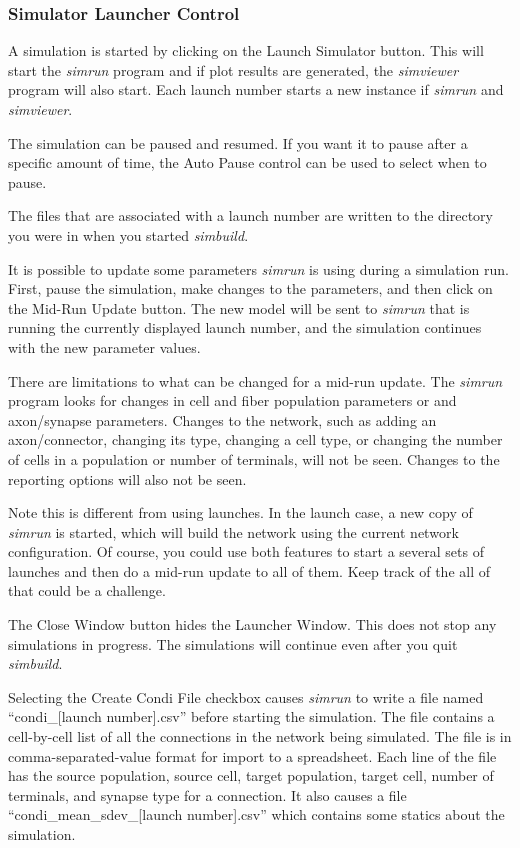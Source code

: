 \documentclass[12pt,openany,oneside]{book}
\newcommand{\prog}[1]{\textit{{#1}}}
\newcommand{\inquotes}[1]{{{``#1''}}}
\begin{document}
\subsubsection{Simulator Launcher Control}

A simulation is started by clicking on the Launch Simulator button.
This will start the \prog{simrun} program and if plot results are
generated, the \prog{simviewer} program will also start.
Each launch number starts a new instance if \prog{simrun} and 
\prog{simviewer}.

The simulation can be paused and resumed. If you want it to pause after
a specific amount of time, the Auto Pause control can be used to select
when to pause.

The files that are associated with a launch number are written to the
directory you were in when you started \prog{simbuild}.

It is possible to update some parameters \prog{simrun} is using during a
simulation run. First, pause the simulation, make changes to the
parameters, and then click on the Mid-Run Update button. The new model
will be sent to \prog{simrun} that is running the currently displayed
launch number, and the simulation continues with the new parameter values.

There are limitations to what can be
changed for a mid-run update. The \prog{simrun} program looks for changes
in cell and fiber population parameters or and axon/synapse parameters.
Changes to the network, such as adding an axon/connector, changing its
type, changing a cell type, or changing the number of cells in a
population or number of terminals, will not be seen. Changes to the
reporting options will also not be seen.

Note this is different from using launches. In the launch case, a new copy
of \prog{simrun} is started, which will build the network using the
current network configuration. Of course, you could use both features to
start a several sets of launches and then do a mid-run update to all of
them. Keep track of the all of that could be a challenge.

The Close Window button hides the Launcher Window.  This does not stop any
simulations in progress. The simulations will continue even after
you quit \prog{simbuild}.

Selecting the Create Condi File checkbox causes \prog{simrun} to write a
file named \inquotes{condi\_[launch number].csv} before starting the
simulation. The file contains a cell-by-cell list of all the connections
in the network being simulated. The file is in comma-separated-value
format for import to a spreadsheet. Each line of the file has the source
population, source cell, target population, target cell, number of
terminals, and synapse type for a connection.  It also causes a file
\inquotes{condi\_mean\_sdev\_[launch number].csv} which contains some
statics about the simulation.
\end{document}
